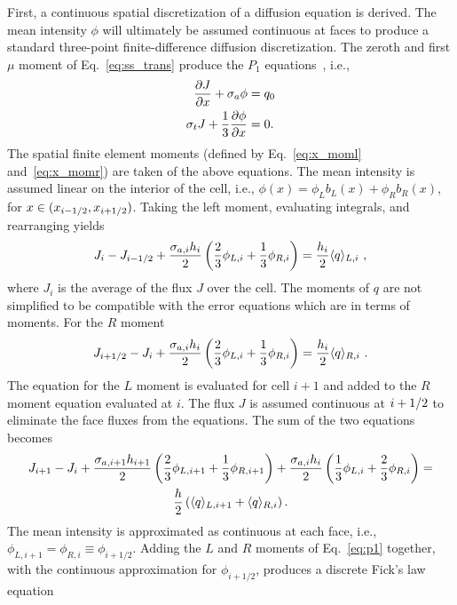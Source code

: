 First, a continuous spatial discretization of a diffusion equation is derived.  
The mean intensity $\phi$ will ultimately be assumed continuous at faces to produce a
standard three-point finite-difference diffusion discretization. 
The zeroth and first $\mu$ moment of Eq.~\eqref{eq:ss_trans} produce the $P_1$
equations~\cite{lewis,wla_thesis}, i.e., 
\begin{align}\label{eq:dsa_bal}
    \frac{\partial J}{\partial x} + \sigma_a \phi &= q_0 \\ \label{eq:p1}
    \sigma_t J + \frac{1}{3} \frac{\partial \phi}{\partial x} &= 0.
\end{align}
The spatial finite element moments (defined by Eq.~\eqref{eq:x_moml} and~\eqref{eq:x_momr})
are taken of the above equations. 
The mean intensity is assumed linear on the interior of the cell, i.e.,
$\phi(x)=\phi_Lb_L(x) + \phi_Rb_R(x)$, for $x\in({x_{i-1/2}},{x_{i+1/2}})$.   Taking the left moment,
evaluating integrals, and rearranging yields
\begin{equation}
    J_{i} - J_{{i-1/2}}  + \frac{\sigma_{a,i}h_i}{2} \left(\frac{2}{3} \phi_{L,i} + \frac{1}{3}
    \phi_{R,i} \right) = \frac{h_i}{2} \langle q \rangle_{L,i}\,\,,
\end{equation}
where $J_i$ is the average of the flux $J$ over the cell. The moments of $q$ are
not simplified to be compatible with the error equations which are in terms of moments. For the $R$ moment
\begin{equation}
    J_{i+1/2} - J_{i}  + \frac{\sigma_{a,i}h_i}{2} \left(\frac{2}{3} \phi_{L,i} + \frac{1}{3}
    \phi_{R,i} \right) = \frac{h_i}{2} \langle q \rangle_{R,i}\,\,.
\end{equation}
The equation for the $L$ moment is evaluated for cell $i+1$ and added to the $R$ moment
equation evaluated at $i$.  The flux $J$ is assumed continuous at ${i+1/2}$ to eliminate
the face fluxes from the equations.  The sum of the two equations becomes
\begin{multline}\label{eq:diff_noclose}
    J_{i+1} - J_{i} + \frac{\sigma_{a,i+1} h_{i+1}}{2}\left(\frac{2}{3} \phi_{L,i+1} +
    \frac{1}{3}\phi_{R,i+1}\right) + \frac{\sigma_{a,i} h_i}{2} \left( \frac{1}{3} \phi_{L,i} +
    \frac{2}{3}\phi_{R,i}\right) =\\ \frac{h}{2} \left(\langle q \rangle_{L,i+1} + \langle q \rangle_{R,i}
    \right).
\end{multline}
The mean intensity is approximated as continuous at each face, i.e., $\phi_{L,i+1} = \phi_{R,i}
\equiv \phi_{i+1/2}$.  Adding the $L$ and $R$ moments of Eq.~\eqref{eq:p1} together, with
the continuous approximation for $\phi_{i+1/2}$, produces a discrete Fick's law equation~\cite{stacy}
